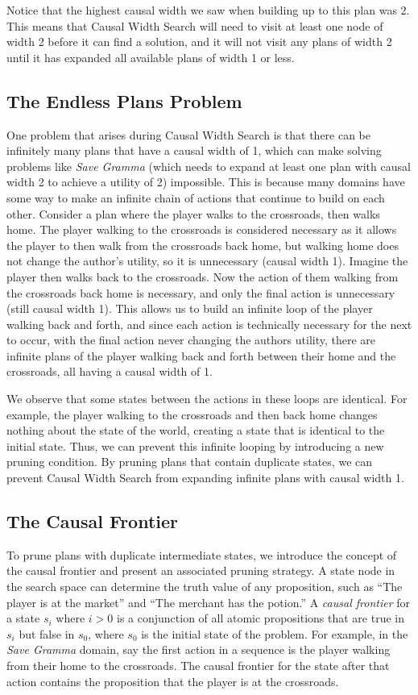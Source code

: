 \documentclass[letterpaper]{article} %
\begin{document}
Notice that the highest causal width we saw when building up to this plan was 2. This means that Causal Width Search will need to visit at least one node of width 2 before it can find a solution, and it will not visit any plans of width 2 until it has expanded all available plans of width 1 or less.

\subsection{The Endless Plans Problem}
One problem that arises during Causal Width Search is that there can be infinitely many plans that have a causal width of 1, which can make solving problems like \textit{Save Gramma} (which needs to expand at least one plan with causal width 2 to achieve a utility of 2)
impossible. This is because many domains have some way to make an infinite chain of actions that continue to build on each other. Consider a plan where the player walks to the crossroads, then walks home. The player walking to the crossroads is considered necessary as it allows the player to then walk from the crossroads back home, but walking home does not change the author's utility, so it is unnecessary (causal width 1). Imagine the player then walks back to the crossroads. Now the action of them walking from the crossroads back home is necessary, and only the final action is unnecessary (still causal width 1). This allows us to build an infinite loop of the player walking back and forth, and since each action is technically necessary for the next to occur, with the final action never changing the authors utility, there are infinite plans of the player walking back and forth between their home and the crossroads, all having a causal width of 1.

We observe that some states between the actions in these loops are identical. For example, the player walking to the crossroads and then back home changes nothing about the state of the world, creating a state that is identical to the initial state. Thus, we can prevent this infinite looping by introducing a new pruning condition. By pruning plans that contain duplicate states, we can prevent Causal Width Search from expanding infinite plans with causal width 1.





\subsection{The Causal Frontier}
To prune plans with duplicate intermediate states, we introduce the concept of the causal frontier and present an associated pruning strategy. A state node in the search space can determine the truth value of any proposition, such as ``The player is at the market'' and ``The merchant has the potion.'' A \textit{causal frontier} for a state $s_i$ where $i > 0$ is a conjunction of all atomic propositions that are true in $s_i$ but false in $s_0$, where $s_0$ is the initial state of the problem. For example, in the \textit{Save Gramma} domain, say the first action in a sequence is the player walking from their home to the crossroads. The causal frontier for the state after that action contains the proposition that the player is at the crossroads.
\end{document}
